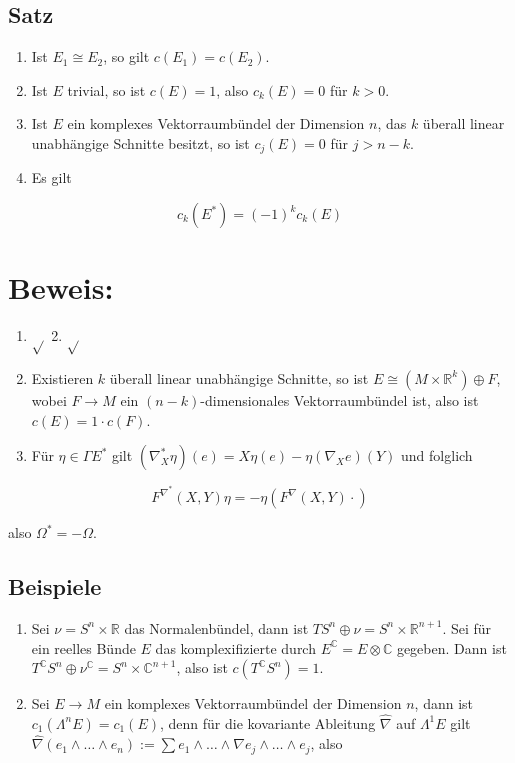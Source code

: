 \documentclass[10pt, letterpaper]{article}
\begin{document}
\subsection*{Satz}
\begin{enumerate}
  \item Ist $E_{1} \cong E_{2}$, so gilt $c\left(E_{1}\right)=c\left(E_{2}\right)$.
  \item Ist $E$ trivial, so ist $c(E)=1$, also $c_{k}(E)=0$ für $k>0$.
  \item Ist $E$ ein komplexes Vektorraumbündel der Dimension $n$, das $k$ überall linear unabhängige Schnitte besitzt, so ist $c_{j}(E)=0$ für $j>n-k$.
  \item Es gilt
\end{enumerate}

$$
c_{k}\left(E^{*}\right)=(-1)^{k} c_{k}(E)
$$

\section*{Beweis:}
\begin{enumerate}
  \item $\sqrt{ }$ 2. $\sqrt{ }$
  \item Existieren $k$ überall linear unabhängige Schnitte, so ist $E \cong\left(M \times \mathbb{R}^{k}\right) \oplus F$, wobei $F \rightarrow M$ ein $(n-k)$-dimensionales Vektorraumbündel ist, also ist $c(E)= 1 \cdot c(F)$.
  \item Für $\eta \in \Gamma E^{*}$ gilt $\left(\nabla_{X}^{*} \eta\right)(e)=X \eta(e)-\eta\left(\nabla_{X} e\right)(Y)$ und folglich
\end{enumerate}

$$
F^{\nabla^{*}}(X, Y) \eta=-\eta\left(F^{\nabla}(X, Y) \cdot\right)
$$

also $\Omega^{*}=-\Omega$.

\subsection*{Beispiele}
\begin{enumerate}
  \item Sei $\nu=S^{n} \times \mathbb{R}$ das Normalenbündel, dann ist $T S^{n} \oplus \nu=S^{n} \times \mathbb{R}^{n+1}$. Sei für ein reelles Bünde $E$ das komplexifizierte durch $E^{\mathbb{C}}=E \otimes \mathbb{C}$ gegeben. Dann ist $T^{\mathbb{C}} S^{n} \oplus \nu^{\mathbb{C}}=S^{n} \times \mathbb{C}^{n+1}$, also ist $c\left(T^{\mathbb{C}} S^{n}\right)=1$.
  \item Sei $E \rightarrow M$ ein komplexes Vektorraumbündel der Dimension $n$, dann ist $c_{1}\left(\Lambda^{n} E\right)=c_{1}(E)$, denn für die kovariante Ableitung $\hat{\nabla}$ auf $\Lambda^{1} E$ gilt $\hat{\nabla}\left(e_{1} \wedge \ldots \wedge e_{n}\right):=\sum e_{1} \wedge \ldots \wedge \nabla e_{j} \wedge \ldots \wedge e_{j}$, also
\end{enumerate}
\end{document}
